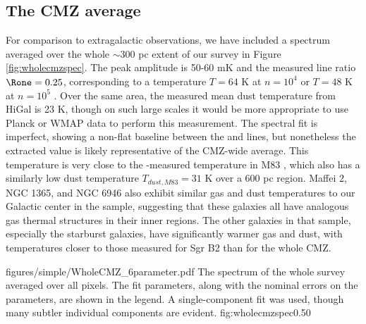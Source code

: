 \subsection{The CMZ average}
For comparison to extragalactic observations, we have included a spectrum
averaged over the whole $\sim300$ pc extent of our survey in Figure
\ref{fig:wholecmzspec}.  The peak amplitude is 50-60 mK and the measured
line ratio $\Rone = 0.25$, corresponding to a temperature $T=64$ K at $n=10^4$
\percc or $T=48$ K at $n=10^5$ \percc.  
Over the same area, the measured mean dust temperature from HiGal is 23 K,
though on such large scales it would be more appropriate to use Planck or WMAP
data to perform this measurement.
The spectral fit is imperfect, showing a non-flat baseline between the
\threetwoone and \threetwotwo lines, but nonetheless the extracted value is
likely representative of the CMZ-wide average.  This temperature is very close
to the \ammonia-measured temperature in M83 \citep[56 K;][]{Mangum2013a}, which
also has a similarly low dust temperature $T_{dust,M83} = 31$ K over a 600 pc
region.  Maffei 2, NGC 1365, and NGC 6946 also exhibit similar gas and dust
temperatures to our Galactic center in the \citet{Mangum2013a} sample,
suggesting that these galaxies all have analogous gas thermal structures in
their inner regions.  The other galaxies in that sample, especially the
starburst galaxies, have significantly warmer gas and dust, with temperatures
closer to those measured for Sgr B2 than for the whole CMZ.


\Figure
{figures/simple/WholeCMZ_6parameter.pdf}
{The spectrum of the whole survey averaged over all pixels.
The fit parameters, along with the nominal errors on the parameters,
are shown in the legend.  A single-component fit was used, though many
subtler individual components are evident.}
{fig:wholecmzspec}{0.5}{0}



